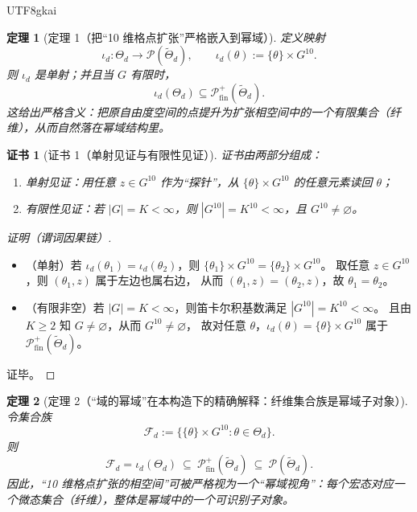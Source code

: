 \documentclass[12pt]{article}
\newtheorem{theorem}{定理}[section]
\newtheorem{Certificate}{证书}[section]
\newcommand{\PP}{\mathcal{P}}
\begin{document}
\begin{CJK*}{UTF8}{gkai}
\begin{theorem}[定理 1（把“10 维格点扩张”严格嵌入到幂域）]
\label{thm:tex27-ch1-thm1}
定义映射
\[
  \iota_d:\Theta_d\to \PP(\widetilde{\Theta}_d),\qquad
  \iota_d(\theta):=\{\theta\}\times G^{10}.
\]
则 $\iota_d$ 是单射；并且当 $G$ 有限时，
\[
  \iota_d(\Theta_d)\subseteq \PP_{\mathrm{fin}}^{+}(\widetilde{\Theta}_d).
\]
这给出严格含义：把原自由度空间的点提升为扩张相空间中的一个有限集合（纤维），从而自然落在幂域结构里。
\end{theorem}

\begin{Certificate}[证书 1（单射见证与有限性见证）]
\label{cert:tex27-ch1-thm1}
证书由两部分组成：
\begin{enumerate}
  \item 单射见证：用任意 $z\in G^{10}$ 作为“探针”，从 $\{\theta\}\times G^{10}$ 的任意元素读回 $\theta$；
  \item 有限性见证：若 $|G|=K<\infty$，则 $|G^{10}|=K^{10}<\infty$，且 $G^{10}\neq\varnothing$。
\end{enumerate}
\end{Certificate}

\begin{proof}[证明（谓词因果链）]
\begin{itemize}
  \item（单射）若 $\iota_d(\theta_1)=\iota_d(\theta_2)$，则
  $\{\theta_1\}\times G^{10}=\{\theta_2\}\times G^{10}$。
  取任意 $z\in G^{10}$，则 $(\theta_1,z)$ 属于左边也属右边，
  从而 $(\theta_1,z)=(\theta_2,z)$，故 $\theta_1=\theta_2$。
  \item（有限非空）若 $|G|=K<\infty$，则笛卡尔积基数满足 $|G^{10}|=K^{10}<\infty$。
  且由 $K\ge 2$ 知 $G\neq\varnothing$，从而 $G^{10}\neq\varnothing$，
  故对任意 $\theta$，$\iota_d(\theta)=\{\theta\}\times G^{10}$ 属于 $\PP_{\mathrm{fin}}^{+}(\widetilde{\Theta}_d)$。
\end{itemize}
证毕。
\end{proof}

\begin{theorem}[定理 2（“域的幂域”在本构造下的精确解释：纤维集合族是幂域子对象）]
\label{thm:tex27-ch1-thm2}
令集合族
\[
  \mathcal{F}_d := \bigl\{\{\theta\}\times G^{10}:\theta\in\Theta_d\bigr\}.
\]
则
\[
  \mathcal{F}_d = \iota_d(\Theta_d)\ \subseteq\ \PP_{\mathrm{fin}}^{+}(\widetilde{\Theta}_d)\ \subseteq\
    \PP(\widetilde{\Theta}_d).
\]
因此，“10 维格点扩张的相空间”可被严格视为一个“幂域视角”：每个宏态对应一个微态集合（纤维），整体是幂域中的一个可识别子对象。
\end{theorem}


\end{CJK*}
\end{document}
